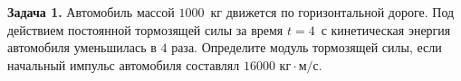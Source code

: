 
\begin{taskbasic}[code={\label{task:mechanics_v11_n22}}]
\textbf{Задача 1.} Автомобиль массой $1000$~кг движется по горизонтальной дороге. Под действием постоянной тормозящей силы за время $t = 4$~с кинетическая энергия автомобиля уменьшилась в $4$ раза. Определите модуль тормозящей силы, если начальный импульс автомобиля составлял $16000\text{ кг}\cdot\text{м/с}$.

\end{taskbasic}

